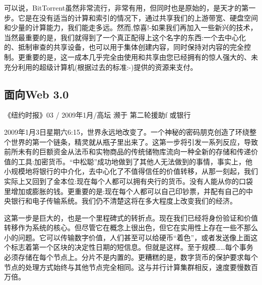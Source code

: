 可以说，BitTorrent虽然非常流行，非常有用，但同时也是原始的，是天才的第一步。它是在没有适当的计算和索引的情况下，通过共享我们的上游带宽、硬盘空间和少量的计算能力，我们能走多远。然而,惊喜!-如果我们再加入一些新兴的技术，当然最重要的是，我们就得到了一个真正配得上这个名字的东西:一个去中心化的、抵制审查的共享设备，也可以用于集体创建内容，同时保持对内容的完全控制。更重要的是，这一成本几乎完全由使用和共享由您已经拥有的惊人强大的、未充分利用的超级计算机(根据过去的标准:-)提供的资源来支付。

\subsection{面向Web 3.0 \statusgreen}\label{sec:towards-web3}


\begin{centerverbatim}
《纽约时报》03 /
2009年1月/高坛
濒于 
第二轮援助f
或银行
\end{centerverbatim}

2009年1月3日星期六6:15，世界永远地改变了。一个神秘的密码朋克创造了环绕整个世界的第一个链条，精灵就从瓶子里出来了。这第一步将引发一系列反应，导致前所未有的巨额资金从法币和实物商品的传统储物库流向一种全新的存储和传递价值的工具:加密货币。“中松聪”成功地做到了其他人无法做到的事情，事实上，他小规模地将银行的中介化，去中心化了不值得信任的价值转移，从那一刻起，我们实际上又回到了金本位:现在每个人都可以拥有央行的货币。没有人能从你的口袋里增加或膨胀的钱。更重要的是:现在每个人都可以自己印钞票，并配有自己的中央银行和电子传输系统。我们仍不清楚这将在多大程度上改变我们的经济。

这第一步是巨大的，也是一个里程碑式的转折点。现在我们已经将身份验证和价值转移作为系统的核心。但尽管它在概念上很出色，但它在实用性上存在一些不那么小的问题。它可以传输数字价值，人们甚至可以给硬币“着色”，或者发送像上面这个标志着第一个区块的决定性日期的短信息。但就是这样。至于规模……每个事务必须存储在每个节点上。分片不是内置的。更糟糕的是，数字货币的保护要求每个节点的处理方式始终与其他节点完全相同。这与并行计算集群相反，速度要慢数百万倍。

